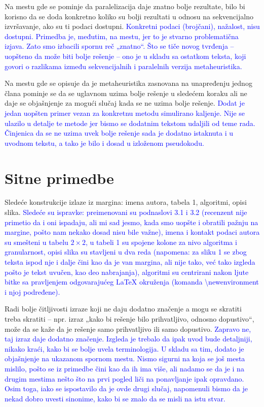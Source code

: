 \documentclass[a4paper]{report}
\newcommand{\odgovor}[1]{\textcolor{blue}{#1}}
\begin{document}
Na  mestu gde se pominje da paralelizacija daje znatno bolje rezultate, bilo bi korisno da se doda konkretno koliko su bolji rezultati u odnosu na sekvencijalno izvršavanje, ako su ti podaci dostupni. \odgovor{Konkretni podaci (brojčani), nažalost, nisu dostupni. Primedba je, međutim, na mestu, jer to je stvarno problematična izjava. Zato smo izbacili spornu reč „znatno“. Što se tiče novog tvrđenja -- uopšteno da može biti bolje rešenje -- ono je u skladu sa ostatkom teksta, koji govori o razlikama između sekvencijalnih i paralelnih verzija metaheuristika.}

Na mestu gde se opisuje da je  metaheuristika zasnovana na unapređenju jednog člana pominje se da se uglavnom uzima bolje rešenje u sledećem koraku ali ne daje se objašnjenje za mogući slučaj kada se ne uzima bolje rešenje. \odgovor{Dodat je jedan uopšten primer vezan za konkretnu metodu simulirano kaljenje. Nije se ulazilo u detalje te metode jer bismo se dodatnim tekstom udaljili od teme rada. Činjenica da se ne uzima uvek bolje rešenje sada je dodatno istaknuta i u uvodnom tekstu, a tako je bilo i dosad u izloženom pseudokodu.}


\section{Sitne primedbe}
Sledeće konstrukcije izlaze iz margina: imena autora, tabela 1, algoritmi, opisi slika. \odgovor{Sledeće su ispravke: preimenovani su podnaslovi 3.1 i 3.2 (recenzent nije primetio da i oni ispadaju, ali mi sad jesmo, kada smo uopšte i obratili pažnju na margine, pošto nam nekako dosad nisu bile važne), imena i kontakt podaci autora su smešteni u tabelu $2\times2$, u tabeli 1 su spojene kolone za nivo algoritma i granularnost, opisi slika su stavljeni u dva reda (napomena: za sliku 1 se zbog teksta ispod nje i dalje čini kao da je van margina, ali nije tako, već tako izgleda pošto je tekst uvučen, kao deo nabrajanja), algoritmi su centrirani nakon ljute bitke sa pravljenjem odgovarajućeg LaTeX okruženja (komanda \textbackslash newenvironment i njoj podređene).}

Radi bolje čitljivosti izraze koji ne daju dodatno značenje a mogu se skratiti treba skratiti – npr. izraz „kako bi rešenje bilo prihvatljivo, odnosno dopustivo“, može da se kaže da je rešenje samo prihvatljivo ili samo dopustivo. \odgovor{Zapravo ne, taj izraz daje dodatno značenje. Izgleda je trebalo da ipak uvod bude detaljniji, nikako kraći, kako bi se bolje uvela terminologija. U skladu sa tim, dodato je objašnjenje na ukazanom spornom mestu. Nismo sigurni na koja se još mesta mislilo, pošto se iz primedbe čini kao da ih ima više, ali nadamo se da je i na drugim mestima nešto što na prvi pogled liči na ponavljanje ipak opravdano. Osim toga, iako se ispostavilo da je ovde drugi slučaj, napomenuli bismo da je nekad dobro uvesti sinonime, kako bi se znalo da se misli na istu stvar.}
\end{document}
